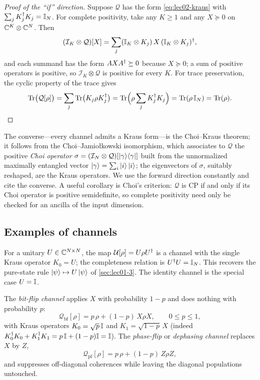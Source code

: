 \begin{proof}[Proof of the ``if'' direction]
Suppose $\mathcal{Q}$ has the form \eqref{eq:lec02-kraus} with
$\sum_j K_j^{\dagger} K_j=\mathbb{I}_N$. For complete positivity, take any $K\ge1$ and any
$X\succeq0$ on $\mathbb{C}^{K}\otimes\mathbb{C}^{N}$. Then
\[
  (\mathcal{I}_K\otimes\mathcal{Q})[X]
   =\sum_j (\mathbb{I}_K\otimes K_j)\,X\,(\mathbb{I}_K\otimes K_j)^{\dagger},
\]
and each summand has the form $AXA^{\dagger}\succeq0$ because $X\succeq0$; a sum of
positive operators is positive, so $\mathcal{I}_K\otimes\mathcal{Q}$ is positive
for every $K$. For trace preservation, the cyclic property of the trace gives
\[
  \operatorname{Tr}\bigl(\mathcal{Q}[\rho]\bigr)
   =\sum_j\operatorname{Tr}\bigl(K_j\rho K_j^{\dagger}\bigr)
   =\operatorname{Tr}\Bigl(\rho\sum_j K_j^{\dagger} K_j\Bigr)
   =\operatorname{Tr}(\rho\,\mathbb{I}_N)=\operatorname{Tr}(\rho). \qedhere
\]
\end{proof}

The converse---every channel admits a Kraus form---is the Choi--Kraus theorem; it
follows from the Choi--Jamio\l kowski isomorphism, which associates to
$\mathcal{Q}$ the positive \emph{Choi operator}
$\sigma=(\mathcal{I}_N\otimes\mathcal{Q})[\ket{\gamma}\!\bra{\gamma}]$ built from the
unnormalized maximally entangled vector $\ket{\gamma}=\sum_i\ket{i}\ket{i}$; the
eigenvectors of $\sigma$, suitably reshaped, are the Kraus operators. We use the
forward direction constantly and cite the converse. A useful corollary is Choi's
criterion: $\mathcal{Q}$ is CP if and only if its Choi operator is positive
semidefinite, so complete positivity need only be checked for an ancilla of the
input dimension.

\subsection{Examples of channels}

\begin{example}\label{exa:lec02-unitary}
For a unitary $U\in\mathbb{C}^{N\times N}$, the map $\mathcal{U}[\rho]=U\rho U^{\dagger}$ is a
channel with the single Kraus operator $K_0=U$; the completeness relation is
$U^{\dagger} U=\mathbb{I}_N$. This recovers the pure-state rule $\ket{\psi}\mapsto U\ket{\psi}$
of \cref{sec:lec01-3}. The identity channel is the special case $U=\mathbb{I}$.
\end{example}

\begin{example}\label{exa:lec02-flip}
The \emph{bit-flip channel} applies $X$ with probability $1-p$ and does nothing
with probability $p$:
\[
  \mathcal{Q}_{\mathrm{bf}}[\rho]=p\,\rho+(1-p)\,X\rho X,\qquad 0\le p\le1,
\]
with Kraus operators $K_0=\sqrt{p}\,\mathbb{I}$ and $K_1=\sqrt{1-p}\,X$ (indeed
$K_0^{\dagger} K_0+K_1^{\dagger} K_1=p\,\mathbb{I}+(1-p)\mathbb{I}=\mathbb{I}$). The \emph{phase-flip} or
\emph{dephasing channel} replaces $X$ by $Z$,
\[
  \mathcal{Q}_{\mathrm{pf}}[\rho]=p\,\rho+(1-p)\,Z\rho Z,
\]
and suppresses off-diagonal coherences while leaving the diagonal populations
untouched.
\end{example}

